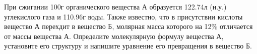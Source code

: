 При сжигании 100г органического вещества А образуется 122.74л (н.у.) углекислого газа и 110.96г воды. Также известно, что в присутствии кислоты вещество А перехдит в вещество Б, молярная масса которого на 12\% отличается от массы вещества А. Определите молекулярную формулу вещества А, установите его структуру и напишите уравнение его превращения в вещество Б.